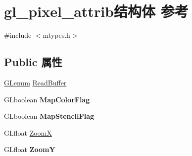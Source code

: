 \hypertarget{structgl__pixel__attrib}{}\section{gl\+\_\+pixel\+\_\+attrib结构体 参考}
\label{structgl__pixel__attrib}


{\ttfamily \#include $<$mtypes.\+h$>$}

\subsection*{Public 属性}
\begin{DoxyCompactItemize}
\item 
\hyperlink{interfacevoid}{G\+Lenum} \hyperlink{structgl__pixel__attrib_a0ce8b9d46b70ccb7b94a2349ca266764}{Read\+Buffer}
\item 
\mbox{\label{structgl__pixel__attrib_aabdf621c310752750860b162d0e3b58d}} 
G\+Lboolean {\bfseries Map\+Color\+Flag}
\item 
\mbox{\label{structgl__pixel__attrib_a6430de880bf3df0653fa35c575ccb16c}} 
G\+Lboolean {\bfseries Map\+Stencil\+Flag}
\item 
G\+Lfloat \hyperlink{structgl__pixel__attrib_adf9a791b9962250e523b2ffc23550e1e}{ZoomX}
\item 
\mbox{\label{structgl__pixel__attrib_aea5dac3b531dc1b36c7943c813ba1dc3}} 
G\+Lfloat {\bfseries ZoomY}
\end{DoxyCompactItemize}
\textbf{ }\par
